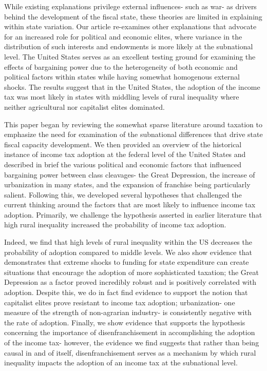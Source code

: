 \documentclass[letter, 12pt]{article}
\begin{document}
While existing explanations privilege external influences- such as war- as drivers behind the development of the fiscal state, these theories are limited in explaining within state variation. Our article re-examines other explanations that advocate for an increased role for political and economic elites, where variance in the distribution of such interests and endowments is more likely at the subnational level. The United States serves as an excellent testing ground for examining the effects of bargaining power due to the heterogeneity of both economic and political factors within states while having somewhat homogenous external shocks. The results suggest that in the United States, the adoption of the income tax was most likely in states with middling levels of rural inequality where neither agricultural nor capitalist elites dominated. 

This paper began by reviewing the somewhat sparse literature around taxation to emphasize the need for examination of the subnational differences that drive state fiscal capacity development. We then provided an overview of the historical instance of income tax adoption at the federal level of the United States and described in brief the various political and economic factors that influenced bargaining power between class cleavages- the Great Depression, the increase of urbanization in many states, and the expansion of franchise being particularly salient. Following this, we developed several hypotheses that challenged the current thinking around the factors that are most likely to influence income tax adoption. Primarily, we challenge the hypothesis asserted in earlier literature that high rural inequality increased the probability of income tax adoption. 

Indeed, we find that high levels of rural inequality within the US decreases the probability of adoption compared to middle levels. We also show evidence that demonstrates that extreme shocks to funding for state expenditure can create situations that encourage the adoption of more sophisticated taxation; the Great Depression as a factor proved incredibly robust and is positively correlated with adoption. Despite this, we do in fact find evidence to support the notion that capitalist elites prove resistant to income tax adoption; urbanization- one measure of the strength of non-agrarian industry- is consistently negative with the rate of adoption. Finally, we show evidence that supports the hypothesis concerning the importance of disenfranchisement in accomplishing the adoption of the income tax- however, the evidence we find suggests that rather than being causal in and of itself, disenfranchisement serves as a mechanism by which rural inequality impacts the adoption of an income tax at the subnational level.
\end{document}
